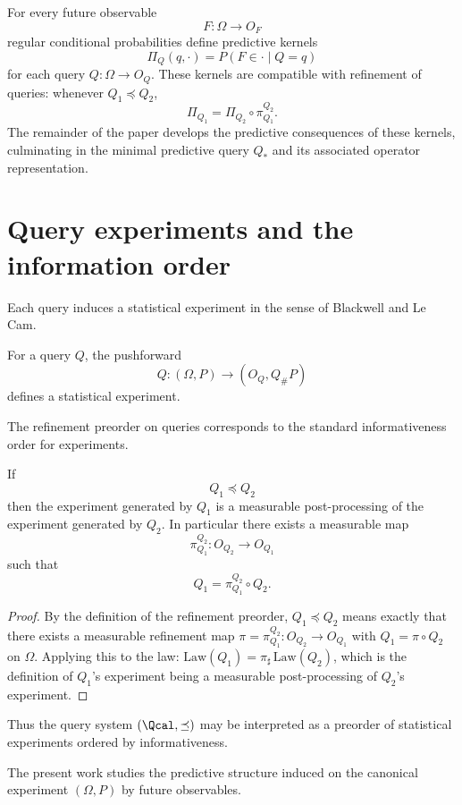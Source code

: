 For every future observable
\[
F:\Omega\to O_F
\]
regular conditional probabilities define predictive kernels
\[
\Pi_Q(q,\cdot)=P(F\in\cdot\mid Q=q)
\]
for each query $Q:\Omega\to O_Q$.  These kernels are compatible with
refinement of queries: whenever $Q_1\preceq Q_2$,
\[
\Pi_{Q_1}=\Pi_{Q_2}\circ\pi^{Q_2}_{Q_1}.
\]
The remainder of the paper develops the predictive consequences of
these kernels, culminating in the minimal predictive query $Q_*$ and
its associated operator representation.

\bigskip

\section[Query experiments]{Query experiments and the information order}\label{sec:query-experiments}

Each query induces a statistical experiment in the sense of Blackwell and
Le Cam.

\begin{definition}
For a query $Q$, the pushforward
\[
Q:(\Omega,P)\to (O_Q,Q_\#P)
\]
defines a statistical experiment.
\end{definition}

The refinement preorder on queries corresponds to the standard
informativeness order for experiments.

\begin{theorem}
If
\[
Q_1 \preceq Q_2
\]
then the experiment generated by $Q_1$ is a measurable
post-processing of the experiment generated by $Q_2$.  In particular
there exists a measurable map
\[
\pi^{Q_2}_{Q_1}:O_{Q_2}\to O_{Q_1}
\]
such that
\[
Q_1=\pi^{Q_2}_{Q_1}\circ Q_2.
\]
\end{theorem}

\begin{proof}
By the definition of the refinement preorder, $Q_1 \preceq Q_2$ means exactly
that there exists a measurable refinement map $\pi = \pi^{Q_2}_{Q_1}: O_{Q_2}\to O_{Q_1}$
with $Q_1 = \pi\circ Q_2$ on $\Omega$.  Applying this to the law:
$\mathrm{Law}(Q_1) = \pi_\sharp\,\mathrm{Law}(Q_2)$, which is the definition of
$Q_1$'s experiment being a measurable post-processing of $Q_2$'s experiment.
\end{proof}

Thus the query system $(\Qcal,\preceq)$ may be interpreted as a preorder
of statistical experiments ordered by informativeness.

\begin{remark}
The present work studies the predictive structure induced on the
canonical experiment $(\Omega,P)$ by future observables.
\end{remark}

